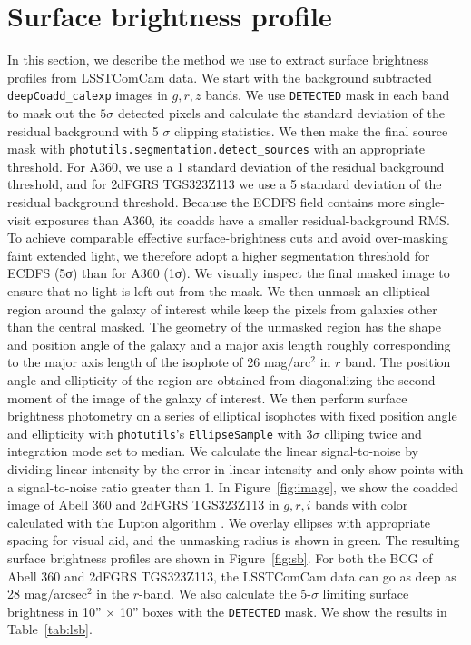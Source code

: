 \documentclass[SE, authoryear,toc]{lsstdoc}
\begin{document}
\section{Surface brightness profile}
In this section, we describe the method we use to extract surface brightness profiles from LSSTComCam data. We start with the background subtracted \texttt{deepCoadd\_calexp} images in $g, r, z$ bands. We use \texttt{DETECTED} mask in each band to mask out the $5 \sigma$ detected pixels and calculate the standard deviation of the residual background with 5 $\sigma$ clipping statistics. We then make the final source mask with \texttt{photutils.segmentation.detect\_sources} with an appropriate threshold. For A360, we use a 1 standard deviation of the residual background threshold, and for 2dFGRS TGS323Z113 we use a 5 standard deviation of the residual background threshold. Because the ECDFS field contains more single-visit exposures than A360, its coadds have a smaller residual-background RMS. To achieve comparable effective surface-brightness cuts and avoid over-masking faint extended light, we therefore adopt a higher segmentation threshold for ECDFS (5σ) than for A360 (1σ). We visually inspect the final masked image to ensure that no light is left out from the mask. We then unmask an elliptical region around the galaxy of interest while keep the pixels from galaxies other than the central masked. The geometry of the unmasked region has the shape and position angle of the galaxy and a major axis length roughly corresponding to the major axis length of the isophote of 26 mag/arc$^2$ in $r$ band. The position angle and ellipticity of the region are obtained from diagonalizing the second moment of the image of the galaxy of interest. We then perform surface brightness photometry on a series of elliptical isophotes with fixed position angle and ellipticity with \texttt{photutils}'s \texttt{EllipseSample} with $3 \sigma$ clliping twice and integration mode set to median. We calculate the linear signal-to-noise by dividing linear intensity by the error in linear intensity and only show points with a signal-to-noise ratio greater than 1. In Figure~\ref{fig:image}, we show the coadded image of Abell 360 and 2dFGRS TGS323Z113 in $g,r,i$ bands with color calculated with the Lupton algorithm \citep{2004PASP..116..133L}. We overlay ellipses with appropriate spacing for visual aid, and the unmasking radius is shown in green. The resulting surface brightness profiles are shown in Figure~\ref{fig:sb}. For both the BCG of Abell 360 and 2dFGRS TGS323Z113, the LSSTComCam data can go as deep as 28 mag/arcsec$^2$ in the $r$-band. We also calculate the 5-$\sigma$ limiting surface brightness in 10'' $\times$ 10'' boxes with the \texttt{DETECTED} mask. We show the results in Table~\ref{tab:lsb}.
\end{document}

